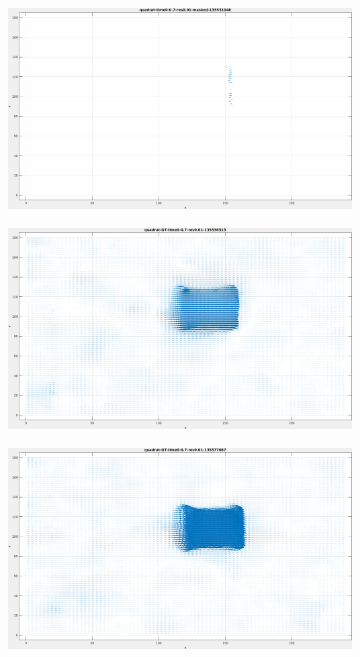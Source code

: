 \begin{figure}[tb]
\begin{subfigure}{.45\textwidth}
  \caption{}
\end{subfigure}
\begin{subfigure}{.45\textwidth}
  \centering
  \includegraphics[height=.6\linewidth]{figs/quadrat/quadrat-masked-2.png}
  \caption{}
\end{subfigure}
\begin{subfigure}{.45\textwidth}
  \centering
  \includegraphics[height=.6\linewidth]{figs/quadrat/quadrat-GT-1.png}
  \caption{}
\end{subfigure}
\begin{subfigure}{.45\textwidth}
  \centering
  \includegraphics[height=.6\linewidth]{figs/quadrat/quadrat-GT-2.png}

\end{subfigure}
\end{figure}
